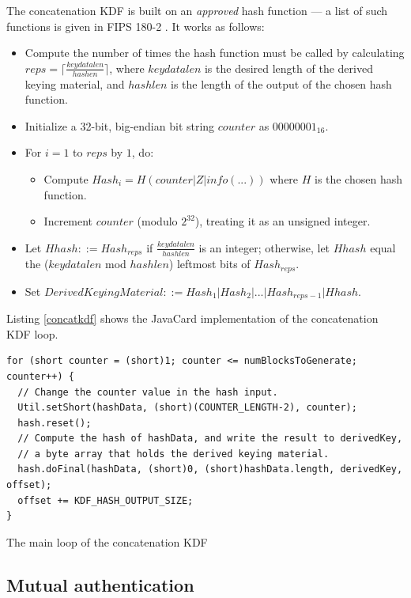 \documentclass[12pt,a4paper,twoside,openright]{report}
\begin{document}
The concatenation KDF is built on an \emph{approved} hash function --- a list of such functions is given in FIPS 180-2 \cite{fips1802}. It works as follows:

\begin{itemize}
\item Compute the number of times the hash function must be called by calculating $reps = \lceil \frac{keydatalen}{hashen} \rceil$, where $keydatalen$ is the desired length of the derived keying material, and $hashlen$ is the length of the output of the chosen hash function.
\item Initialize a 32-bit, big-endian bit string $counter$ as $00000001_{16}$.
\item For $i = 1$ to $reps$ by $1$, do:
	\begin{itemize}
	\item Compute $Hash_i = H(counter \vert Z \vert info(...))$ where $H$ is the chosen hash function.
	\item Increment $counter$ (modulo $2^{32}$), treating it as an unsigned integer.
	\end{itemize}
\item Let $Hhash ::= Hash_{reps}$ if $\frac{keydatalen}{hashlen}$ is an integer; otherwise, let $Hhash$ equal the ($keydatalen$ mod $hashlen$) leftmost bits of $Hash_{reps}$.
\item Set $DerivedKeyingMaterial ::= Hash_1 \vert Hash_2 \vert ... \vert Hash_{reps-1} \vert Hhash$.
\end{itemize}

\noindent
Listing \autoref{concatkdf} shows the JavaCard implementation of the concatenation KDF loop.

\begin{listing}
\begin{verbatim}
for (short counter = (short)1; counter <= numBlocksToGenerate; counter++) {
  // Change the counter value in the hash input.
  Util.setShort(hashData, (short)(COUNTER_LENGTH-2), counter);
  hash.reset();
  // Compute the hash of hashData, and write the result to derivedKey,
  // a byte array that holds the derived keying material.
  hash.doFinal(hashData, (short)0, (short)hashData.length, derivedKey, offset);
  offset += KDF_HASH_OUTPUT_SIZE;
}
\end{verbatim}
\caption{The main loop of the concatenation KDF}
\label{concatkdf}
\end{listing}

\subsection{Mutual authentication}
\end{document}
